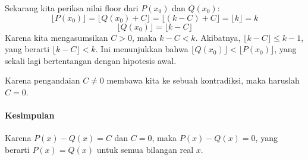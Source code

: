 Sekarang kita periksa nilai floor dari $P(x_0)$ dan $Q(x_0)$:
\[ \lfloor P(x_0) \rfloor = \lfloor Q(x_0) + C \rfloor = \lfloor (k-C) + C \rfloor = \lfloor k \rfloor = k \]
\[ \lfloor Q(x_0) \rfloor = \lfloor k-C \rfloor \]
Karena kita mengasumsikan $C>0$, maka $k-C < k$. Akibatnya, $\lfloor k-C \rfloor \le k-1$, yang berarti $\lfloor k-C \rfloor < k$.
Ini menunjukkan bahwa $\lfloor Q(x_0) \rfloor < \lfloor P(x_0) \rfloor$, yang sekali lagi bertentangan dengan hipotesis awal.

Karena pengandaian $C \neq 0$ membawa kita ke sebuah kontradiksi, maka haruslah $C=0$.

\paragraph{Kesimpulan}
Karena $P(x) - Q(x) = C$ dan $C=0$, maka $P(x)-Q(x)=0$, yang berarti $P(x)=Q(x)$ untuk semua bilangan real $x$.
